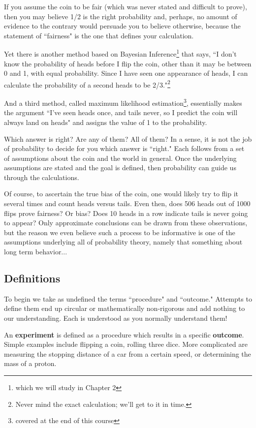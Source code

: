 \documentclass[../main.tex]{subfiles}
\begin{document}
If you assume the coin to be fair (which was never stated and
difficult to prove), then you may believe 1/2 is the right
probability and, perhaps, no amount of evidence to the contrary would
persuade you to believe otherwise, because the statement of ``fairness"
is the one that defines your calculation.

Yet there is another method based on Bayesian Inference\footnote{which
we will study in Chapter 2} that says, ``I don't know the probability 
of heads before I flip the coin, other than it may be between 0 and 1, 
with equal probability. Since I have seen one appearance of heads,
I can calculate the probability of a second heads to be 2/3."\footnote{Never
	mind the exact calculation; we'll get to it in time.}

And a third method, called maximum likelihood estimation\footnote{covered at the end of this course}, essentially
makes the argument ``I've seen heads once, and tails never, so I
predict the coin will always land on heads" and assigns the value of
1 to the probability.

Which answer is right? Are any of them? All of them? In a sense, it
is not the job of probability to decide for you which answer is ``right." Each follows from a set of assumptions about the coin and
the world in general. Once the underlying assumptions are stated
and the goal is defined, then probability can guide us through the
calculations. 

Of course, to ascertain the true bias of the coin, one would likely try to flip it several times and count heads versus tails. Even then,
does 506 heads out of 1000 flips prove fairness? Or bias? Does 10 heads in a row indicate tails is never going to appear? Only approximate
conclusions can be drawn from these observations, but the reason we
even believe such a process to be informative is one of the assumptions underlying all of probability theory, namely that something about long term behavior...

\subsection{Definitions}
To begin we take as undefined the terms ``procedure"
and ``outcome." Attempts to define them end up circular or
mathematically non-rigorous and add nothing to our understanding. Each
is understood as you normally understand them!

An \textbf{experiment} is defined as a procedure which results in
a specific \textbf{outcome}. Simple examples include flipping a coin, rolling three dice. More complicated are measuring the stopping distance
of a car from a certain speed, or determining the mass of a proton.
\end{document}
